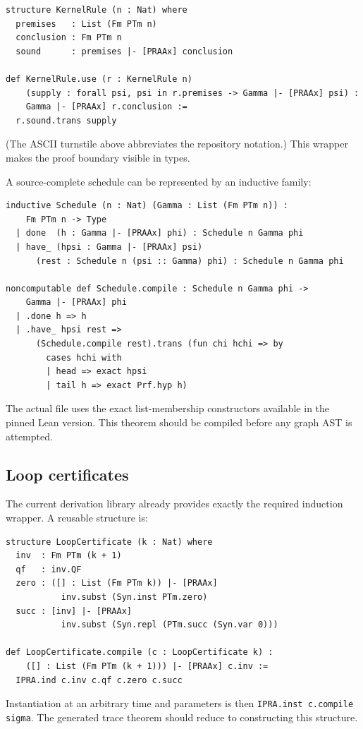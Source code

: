 \begin{lstlisting}
structure KernelRule (n : Nat) where
  premises   : List (Fm PTm n)
  conclusion : Fm PTm n
  sound      : premises |- [PRAAx] conclusion

def KernelRule.use (r : KernelRule n)
    (supply : forall psi, psi in r.premises -> Gamma |- [PRAAx] psi) :
    Gamma |- [PRAAx] r.conclusion :=
  r.sound.trans supply
\end{lstlisting}
(The ASCII turnstile above abbreviates the repository notation.)  This wrapper makes the proof boundary visible in types.

A source-complete schedule can be represented by an inductive family:

\begin{lstlisting}
inductive Schedule (n : Nat) (Gamma : List (Fm PTm n)) :
    Fm PTm n -> Type
  | done  (h : Gamma |- [PRAAx] phi) : Schedule n Gamma phi
  | have_ (hpsi : Gamma |- [PRAAx] psi)
      (rest : Schedule n (psi :: Gamma) phi) : Schedule n Gamma phi

noncomputable def Schedule.compile : Schedule n Gamma phi ->
    Gamma |- [PRAAx] phi
  | .done h => h
  | .have_ hpsi rest =>
      (Schedule.compile rest).trans (fun chi hchi => by
        cases hchi with
        | head => exact hpsi
        | tail h => exact Prf.hyp h)
\end{lstlisting}
The actual file uses the exact list-membership constructors available in the pinned Lean version.  This theorem should be compiled before any graph AST is attempted.

\subsection{Loop certificates}

The current derivation library already provides exactly the required induction wrapper.  A reusable structure is:

\begin{lstlisting}
structure LoopCertificate (k : Nat) where
  inv  : Fm PTm (k + 1)
  qf   : inv.QF
  zero : ([] : List (Fm PTm k)) |- [PRAAx]
           inv.subst (Syn.inst PTm.zero)
  succ : [inv] |- [PRAAx]
           inv.subst (Syn.repl (PTm.succ (Syn.var 0)))

def LoopCertificate.compile (c : LoopCertificate k) :
    ([] : List (Fm PTm (k + 1))) |- [PRAAx] c.inv :=
  IPRA.ind c.inv c.qf c.zero c.succ
\end{lstlisting}
Instantiation at an arbitrary time and parameters is then \texttt{IPRA.inst c.compile sigma}.  The generated trace theorem should reduce to constructing this structure.

